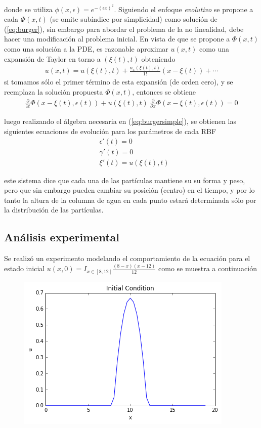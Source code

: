 \documentclass[spanish]{article}
\begin{document}
    \noindent donde se utiliza $\displaystyle \phi(x,\epsilon) = e^{-(\epsilon x)^2}$. Siguiendo el enfoque \textit{evolutivo} se propone a cada $\Phi(x,t)$ (se omite subíndice por simplicidad) como solución de (\ref{eq:burger}), sin embargo para abordar el problema de la no linealidad, debe hacer una modificación al problema inicial. En vista de que se propone a $\Phi(x,t)$ como una solución a la PDE, es razonable aproximar $u(x,t)$ como una expansión de Taylor en torno a $(\xi(t),t)$ obteniendo
    \begin{align}
      u(x,t) = u(\xi(t),t) + \frac{u_x(\xi(t),t)}{1!}(x-\xi(t)) + \cdots
    \end{align}
    si tomamos sólo el primer término de esta expansión (de orden cero), y  se reemplaza la solución propuesta $\Phi(x,t)$, entonces se obtiene
    \begin{align}
      \frac{\partial}{\partial t}\Phi(x-\xi(t),\epsilon(t)) + u(\xi(t),t)\ \frac{\partial}{\partial x}\Phi(x-\xi(t),\epsilon(t)) = 0
      \label{eq:burgersimple}
    \end{align}

    \noindent luego realizando el álgebra necesaria en (\ref{eq:burgersimple}), se obtienen las siguientes ecuaciones de evolución para los parámetros de cada RBF
    \begin{align*}
    & \epsilon'(t) = 0 \\
    & \gamma'(t) = 0  \\
    & \xi'(t) = u(\xi(t),t)
    \end{align*}
   
    \noindent este sistema dice que cada una de las partículas mantiene su su forma y peso, pero que sin embargo pueden cambiar su posición (centro) en el tiempo, y por lo tanto la altura de la columna de agua en cada punto estará determinada sólo por la distribución de las partículas.


    \subsection{Análisis experimental}
    Se realizó un experimento modelando el comportamiento de la ecuación para el estado inicial $u(x,0) = I_{x \in [8,12]}\frac{(8-x)(x-12)}{12}$ como se muestra a continuación

    \begin{figure}[H]
        \centering
        \includegraphics[scale=0.6]{initialu.png}
    \end{figure}
    
\end{document}
